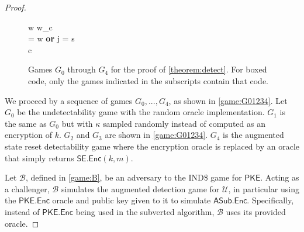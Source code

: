 \begin{proof}
\begin{figure}[t]
\begin{pchstack}
\begin{pcvstack}
\begin{pchstack}
{	\pcind w \leftarrow w_c \\
	\pcuntil \kappa = w \textbf{ or } j = s \\
	\pcreturn c
}
\end{pchstack}
\end{pcvstack}
\end{pchstack}
\caption[Games $G_0$ through $G_4$ for the proof of \autoref{theorem:detect}]{Games $G_0$ through $G_4$ for the proof of \autoref{theorem:detect}. For boxed code, only the games indicated in the subscripts contain that code.}
\label{game:G01234}
\end{figure}

We proceed by a sequence of games $G_0,...,G_4$, as shown in \autoref{game:G01234}. Let $G_0$ be the undetectability game with the random oracle implementation. $G_1$ is the same as $G_0$ but with $\kappa$ sampled randomly instead of computed as an encryption of $k$. $G_2$ and $G_3$ are shown in \autoref{game:G01234}. $G_4$ is the augmented state reset detectability game where the encryption oracle is replaced by an oracle that simply returns $\mathsf{SE.Enc}(k,m)$.

\iffullversion

Let $\mathcal{B}$, defined in \autoref{game:B}, be an adversary to the IND\$ game for $\mathsf{PKE}$. Acting as a challenger, $\mathcal{B}$ simulates the augmented detection game for $\mathcal{U}$, in particular using the $\mathsf{PKE.Enc}$ oracle and public key given to it to simulate $\mathsf{ASub.Enc}$. Specifically, instead of $\mathsf{PKE.Enc}$ being used in the subverted algorithm, $\mathcal{B}$ uses its provided oracle.


\end{proof}
